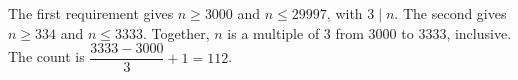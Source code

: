 The first requirement gives $n\ge3000$ and $n\le29997$, with $3\mid n$. The second gives $n\ge334$ and $n\le3333$. Together, $n$ is a multiple of $3$ from $3000$ to $3333$, inclusive. The count is $\dfrac{3333-3000}{3}+1=\boxed{112}$.
